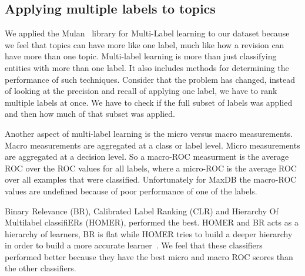 \documentclass{acm_proc_article-sp}
\begin{document}
\subsection{Applying multiple labels to topics}

We applied the Mulan~\cite{mulan} library for Multi-Label learning to our dataset because we feel that topics can have more like one label, much like how a revision can have more than one topic. Multi-label learning is more than just classifying entities with more than one label. It also includes methods for determining the performance of such techniques. Consider that the problem has changed, instead of looking at the precision and recall of applying one label, we have to rank multiple labels at once. We have to check if the full subset of labels was applied and then how much of that subset was applied.

Another aspect of multi-label learning is the micro versus macro measurements. Macro measurements are aggregated at a class or label level. Micro measurements are aggregated at a decision level. So a macro-ROC measurment is the average ROC over the ROC values for all labels, where a micro-ROC is the average ROC over all examples that were classified. Unfortunately for MaxDB the macro-ROC values are undefined because of poor performance of one of the labels.

Binary Relevance (BR), Calibrated Label Ranking (CLR) and Hierarchy Of Multilabel classifiERs (HOMER), performed the best. HOMER and BR acts as a hierarchy of learners, BR is flat while HOMER tries to build a deeper hierarchy in order to build a more accurate learner~\cite{mulan}. We feel that these classifiers performed better because they have the best micro and macro ROC scores than the other classifiers.
\end{document}
